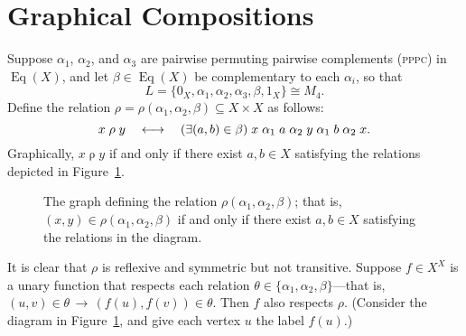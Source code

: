 \documentclass{amsart}
\theoremstyle{plain}
\theoremstyle{definition}
\theoremstyle{definition}
\numberwithin{equation}{section}
\newcommand{\<}{\ensuremath{\langle}}
\renewcommand{\>}{\ensuremath{\rangle}}
\newcommand{\Eq}{\ensuremath{\operatorname{Eq}}}
\newcommand{\rel}{\ensuremath{\mathrel}}
\newcommand{\PPPC}{\textsc{pppc}\xspace}
\begin{document}
\section{Graphical Compositions}
Suppose $\alpha_1$, $\alpha_2$, and $\alpha_3$ are pairwise permuting pairwise
complements (\PPPC) in $\Eq(X)$, and let $\beta\in \Eq(X)$ be complementary to
each 
$\alpha_i$, so that 
\[
L = \{0_X, \alpha_1, \alpha_2, \alpha_3, \beta, 1_X\} \cong M_4.
\]  
Define the relation $\rho=\rho(\alpha_1, \alpha_2, \beta)\subseteq X\times X$ as
follows:
\[
x \mathrel{\rho} y \quad \longleftrightarrow \quad (\exists (a, b) \in \beta)\;  
x \rel{\alpha_1} a \rel{\alpha_2} y \rel{\alpha_1} b \rel{\alpha_2} x.
\]
Graphically, $x \mathrel{\rho} y$ if and only if there exist $a, b \in X$
satisfying the relations depicted in Figure~\ref{fig:rho}.

\newcommand\dotsize{1pt}
\begin{figure}
  \caption{The graph defining the relation $\rho(\alpha_1, \alpha_2, \beta)$;
    that is, $(x,y) \in \rho(\alpha_1, \alpha_2, \beta)$ if and only if there
    exist $a, b \in X$ satisfying the relations in the diagram.}
  \label{fig:rho}
\end{figure}

It is clear that $\rho$ is reflexive and symmetric but not transitive.
Suppose $f\in X^X$ is a unary function that respects each relation 
$\theta \in \{\alpha_1, \alpha_2, \beta\}$---that is, 
$(u,v)\in \theta \, \longrightarrow \, (f(u), f(v))\in \theta$.  Then $f$ also
respects $\rho$. (Consider the diagram in Figure~\ref{fig:rho}, and give
each vertex $u$ the label $f(u)$.)
\end{document}
